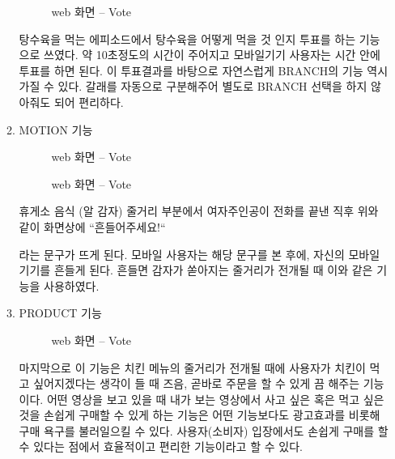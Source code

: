 \documentclass{oblivoir}
\begin{document}
\begin{enumerate}
\begin{enumerate}
        \begin{figure}[h!]
            \centering
            \caption{web 화면 – Vote}
        \end{figure} 

    탕수육을 먹는 에피소드에서 탕수육을 어떻게 먹을 것 인지 투표를 하는 기능으로 쓰였다. 약 10초정도의 시간이 주어지고 모바일기기 사용자는 시간 안에 투표를 하면 된다. 이 투표결과를 바탕으로 자연스럽게 BRANCH의 기능 역시 가질 수 있다. 갈래를 자동으로 구분해주어 별도로 BRANCH 선택을 하지 않아줘도 되어 편리하다. 

        \item MOTION 기능

        \begin{figure}[h!]
            \centering
            \caption{web 화면 – Vote}
        \end{figure} 

        \begin{figure}[h!]
            \centering
            \caption{web 화면 – Vote}
        \end{figure} 


    휴게소 음식 (알 감자) 줄거리 부분에서 여자주인공이 전화를 끝낸 직후 위와 같이 화면상에 “흔들어주세요!“

    라는 문구가 뜨게 된다. 모바일 사용자는 해당 문구를 본 후에, 자신의 모바일 기기를 흔들게 된다. 흔들면 감자가 쏟아지는 줄거리가 전개될 때 이와 같은 기능을 사용하였다.

        \item PRODUCT 기능
        
        \begin{figure}[h!]
            \centering
            \caption{web 화면 – Vote}
        \end{figure} 

    마지막으로 이 기능은 치킨 메뉴의 줄거리가 전개될 때에 사용자가 치킨이 먹고 싶어지겠다는 생각이 들 때 즈음, 곧바로 주문을 할 수 있게 끔 해주는 기능이다. 어떤 영상을 보고 있을 때 내가 보는 영상에서 사고 싶은 혹은 먹고 싶은 것을 손쉽게 구매할 수 있게 하는 기능은 어떤 기능보다도 광고효과를 비롯해 구매 욕구를 불러일으킬 수 있다. 사용자(소비자) 입장에서도 손쉽게 구매를 할 수 있다는 점에서 효율적이고 편리한 기능이라고 할 수 있다.
    \end{enumerate}
\end{enumerate}
\end{document}
